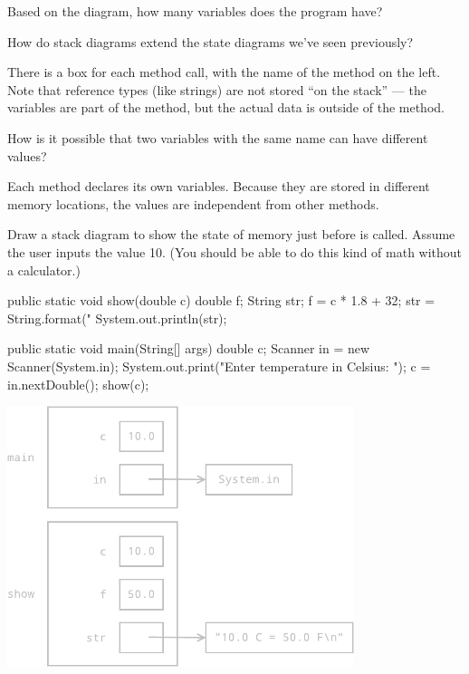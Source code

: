 \Q Based on the diagram, how many variables does the program have? 
\vspace{1em}


\Q How do stack diagrams extend the state diagrams we've seen previously?

\begin{answer}[5em]
There is a box for each method call, with the name of the method on the left.
Note that reference types (like strings) are not stored ``on the stack'' --- the variables are part of the method, but the actual data is outside of the method.
\end{answer}


\Q How is it possible that two variables with the same name can have different values?

\begin{answer}
Each method declares its own variables.
Because they are stored in different memory locations, the values are independent from other methods.
\end{answer}


\Q Draw a stack diagram to show the state of memory just before  is called.
Assume the user inputs the value 10.
(You should be able to do this kind of math without a calculator.)

\vspace{1ex}
\begin{javalst}
    public static void show(double c) {
        double f;
        String str;
        f = c * 1.8 + 32;
        str = String.format("%
        System.out.println(str);
    }

    public static void main(String[] args) {
        double c;
        Scanner in = new Scanner(System.in);
        System.out.print("Enter temperature in Celsius: ");
        c = in.nextDouble();
        show(c);
    }
\end{javalst}
\vspace{-1ex}

\begin{answer}[3.1in]
\hfill
\includegraphics[height=3in]{stack2.pdf}
\end{answer}


